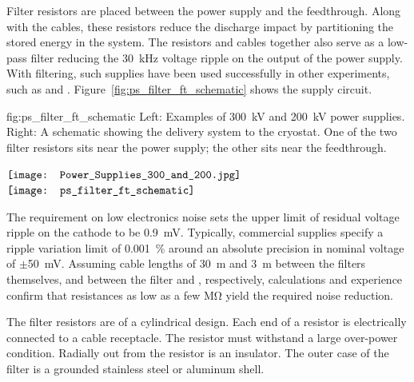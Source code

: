 
Filter resistors  are placed between the power supply and the feedthrough.  Along with the cables, these resistors reduce the discharge impact by partitioning the stored energy in the system.  The resistors and cables together also serve as a low-pass filter reducing 
the \SI{30}{kHz} voltage ripple on the output of the power supply.  With filtering, such supplies have been used successfully in other \lartpc experiments, such as \microboone and . Figure~\ref{fig:ps_filter_ft_schematic} shows the  supply circuit.

\begin{dunefigure}  
{fig:ps_filter_ft_schematic}
{Left: Examples of \SI{300}{kV} and \SI{200}{kV} power supplies. %
Right:  A schematic showing the  delivery system to the cryostat. %
One of the two filter resistors sits near the power supply; the other sits near the feedthrough.}
\begin{minipage}{\textwidth}%
  \centering
 $\vcenter{\hbox{\texttt{[image: Power\_Supplies\_300\_and\_200.jpg]}}}$
 \hspace*{0.001\textwidth}  $\vcenter{\hbox{\texttt{[image: ps\_filter\_ft\_schematic]}}}$
\end{minipage}
\end{dunefigure}
The requirement  
on low electronics noise sets the upper limit of residual voltage ripple on the cathode to be \SI{0.9}{mV}. 
Typically, commercial supplies specify a ripple variation limit of 
\SI{.001}{\%} around an absolute precision in nominal voltage of $\pm$\SI{50}{mV}.
%
Assuming cable lengths of \SI{30}{m} and \SI{3}{m} between the filters themselves, and between the filter and \fdth, respectively, calculations and experience confirm that resistances as low as a few \si{\mega\ohm} yield the required noise reduction. 

The %
filter resistors are of a cylindrical design. 
Each end of a  resistor is electrically connected to a cable receptacle. 
The resistor %
must withstand a large over-power condition.  Radially out from the resistor is an insulator. %
The outer case of the filter is a grounded stainless steel or aluminum shell. 

